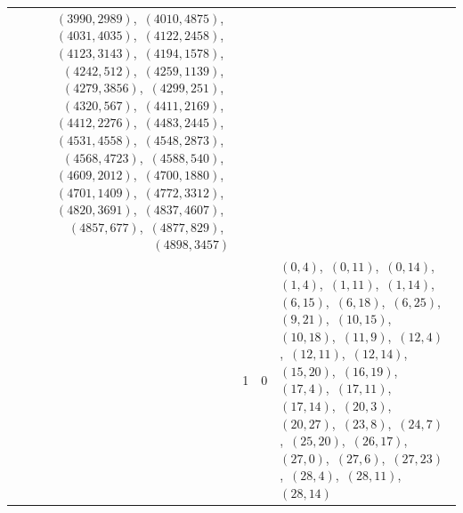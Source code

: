 \documentclass[11pt]{article}
\begin{document}
\begin{longtable}{@{}rrl>{\raggedright\arraybackslash}p{}@{}}
$(3990,2989)$,\allowbreak\ $(4010,4875)$,\allowbreak\ $(4031,4035)$,\allowbreak\ $(4122,2458)$,\allowbreak\ $(4123,3143)$,\allowbreak\ $(4194,1578)$,\allowbreak\ $(4242,512)$,\allowbreak\ $(4259,1139)$,\allowbreak\ $(4279,3856)$,\allowbreak\ $(4299,251)$,\allowbreak\ $(4320,567)$,\allowbreak\ $(4411,2169)$,\allowbreak\ $(4412,2276)$,\allowbreak\ $(4483,2445)$,\allowbreak\ $(4531,4558)$,\allowbreak\ $(4548,2873)$,\allowbreak\ $(4568,4723)$,\allowbreak\ $(4588,540)$,\allowbreak\ $(4609,2012)$,\allowbreak\ $(4700,1880)$,\allowbreak\ $(4701,1409)$,\allowbreak\ $(4772,3312)$,\allowbreak\ $(4820,3691)$,\allowbreak\ $(4837,4607)$,\allowbreak\ $(4857,677)$,\allowbreak\ $(4877,829)$,\allowbreak\ $(4898,3457)$\\
\addlinespace[3pt]
29 & 1 & $0$ & $(0,4)$,\allowbreak\ $(0,11)$,\allowbreak\ $(0,14)$,\allowbreak\ $(1,4)$,\allowbreak\ $(1,11)$,\allowbreak\ $(1,14)$,\allowbreak\ $(6,15)$,\allowbreak\ $(6,18)$,\allowbreak\ $(6,25)$,\allowbreak\ $(9,21)$,\allowbreak\ $(10,15)$,\allowbreak\ $(10,18)$,\allowbreak\ $(11,9)$,\allowbreak\ $(12,4)$,\allowbreak\ $(12,11)$,\allowbreak\ $(12,14)$,\allowbreak\ $(15,20)$,\allowbreak\ $(16,19)$,\allowbreak\ $(17,4)$,\allowbreak\ $(17,11)$,\allowbreak\ $(17,14)$,\allowbreak\ $(20,3)$,\allowbreak\ $(20,27)$,\allowbreak\ $(23,8)$,\allowbreak\ $(24,7)$,\allowbreak\ $(25,20)$,\allowbreak\ $(26,17)$,\allowbreak\ $(27,0)$,\allowbreak\ $(27,6)$,\allowbreak\ $(27,23)$,\allowbreak\ $(28,4)$,\allowbreak\ $(28,11)$,\allowbreak\ $(28,14)$\\

\end{longtable}
\end{document}
